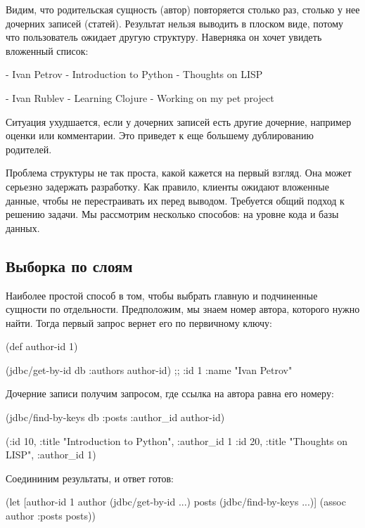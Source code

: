 Видим, что родительская сущность (автор) повторяется столько раз, столько у нее дочерних записей (статей). Результат нельзя выводить в плоском виде, потому что пользователь ожидает другую структуру. Наверняка он хочет увидеть вложенный список:

- Ivan Petrov
  - Introduction to Python
  - Thoughts on LISP

- Ivan Rublev
  - Learning Clojure
  - Working on my pet project

Ситуация ухудшается, если у дочерних записей есть другие дочерние, например оценки или комментарии. Это приведет к еще большему дублированию родителей.

Проблема структуры не так проста, какой кажется на первый взгляд. Она может серьезно задержать разработку. Как правило, клиенты ожидают вложенные данные, чтобы не перестраивать их перед выводом. Требуется общий подход к решению задачи. Мы рассмотрим несколько способов: на уровне кода и базы данных.

\subsection{Выборка по слоям}

Наиболее простой способ в том, чтобы выбрать главную и подчиненные сущности по отдельности. Предположим, мы знаем номер автора, которого нужно найти. Тогда первый запрос вернет его по первичному ключу:

\begin{english}
  \begin{clojure}
(def author-id 1)

(jdbc/get-by-id db :authors author-id)
;; {:id 1 :name "Ivan Petrov"}
  \end{clojure}
\end{english}

Дочерние записи получим запросом, где ссылка на автора равна его номеру:

\begin{english}
  \begin{clojure}
(jdbc/find-by-keys db :posts {:author_id author-id})

({:id 10, :title "Introduction to Python", :author_id 1}
 {:id 20, :title "Thoughts on LISP", :author_id 1})
  \end{clojure}
\end{english}

Соедининим результаты, и ответ готов:

\begin{english}
  \begin{clojure}
(let [author-id 1
      author (jdbc/get-by-id ...)
      posts (jdbc/find-by-keys ...)]
  (assoc author :posts posts))
  \end{clojure}
\end{english}

